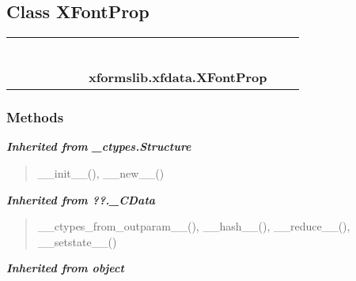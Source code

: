 \subsection{Class XFontProp}

    \label{xformslib:xfdata:XFontProp}
\begin{tabular}{cccccccccc}
\multicolumn{2}{r}{\settowidth{\BCL}{object}\multirow{2}{\BCL}{object}}
&&
&&
&&
  \\\cline{3-3}
  &&\multicolumn{1}{c|}{}
&&
&&
&&
  \\
\multicolumn{4}{r}{\settowidth{\BCL}{??.\_CData}\multirow{2}{\BCL}{??.\_CData}}
&&
&&
  \\\cline{5-5}
  &&&&\multicolumn{1}{c|}{}
&&
&&
  \\
\multicolumn{6}{r}{\settowidth{\BCL}{\_ctypes.Structure}\multirow{2}{\BCL}{\_ctypes.Structure}}
&&
  \\\cline{7-7}
  &&&&&&\multicolumn{1}{c|}{}
&&
  \\
&&&&&&\multicolumn{2}{l}{\textbf{xformslib.xfdata.XFontProp}}
\end{tabular}



  \subsubsection{Methods}


\large{\textbf{\textit{Inherited from \_ctypes.Structure}}}

\begin{quote}
\_\_init\_\_(), \_\_new\_\_()
\end{quote}

\large{\textbf{\textit{Inherited from ??.\_CData}}}

\begin{quote}
\_\_ctypes\_from\_outparam\_\_(), \_\_hash\_\_(), \_\_reduce\_\_(), \_\_setstate\_\_()
\end{quote}

\large{\textbf{\textit{Inherited from object}}}

